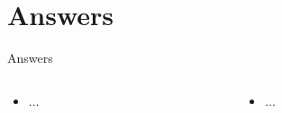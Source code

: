 \documentclass{beamer}
\begin{document}
\section{Answers}

\begin{frame}{Answers}
\begin{columns}[T]
\begin{column}{0.5\textwidth}
\begin{itemize}
\item ...
\end{itemize}
\end{column}
\begin{column}{0.5\textwidth}
\begin{itemize}
\item ...
\end{itemize}
\end{column}
\end{columns}
\end{frame}
\end{document}
